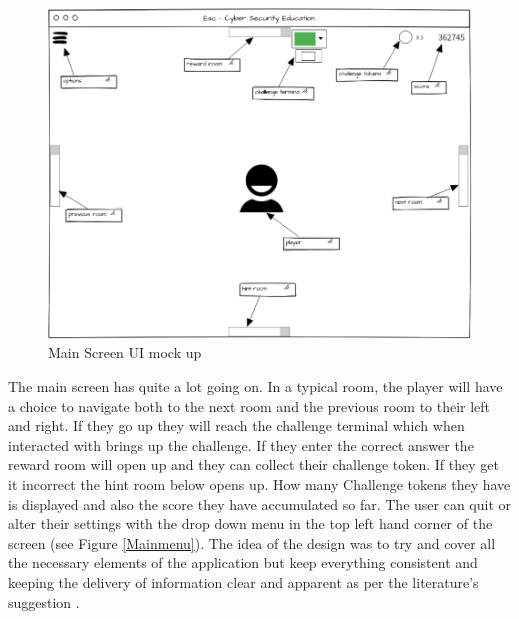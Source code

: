 \documentclass[12pt,a4paper]{article}
\begin{document}
\begin{figure}[h]
    \centering
    \includegraphics[width=1.0\textwidth]{Figs/Ui_main_screen.PNG} 
    \caption{Main Screen UI mock up} 
    \label{Mainscreen}
\end{figure}   

The main screen has quite a lot going on. In a typical room, the player will have a choice to navigate both to the next room and the previous room to their left and right. If they go up they will reach the challenge terminal which when interacted with brings up the challenge. If they enter the correct answer the reward room will open up and they can collect their challenge token. If they get it incorrect the hint room below opens up. How many Challenge tokens they have is displayed and also the score they have accumulated so far. The user can quit or alter their settings with the drop down menu in the top left hand corner of the screen (see Figure \ref{Mainmenu}). The idea of the design was to try and cover all the necessary elements of the application but keep everything consistent and keeping the delivery of information clear and apparent as per the literature's suggestion \cite{bulling2016pervasive} \cite{nielsen2014coordinating}. 
\end{document}
